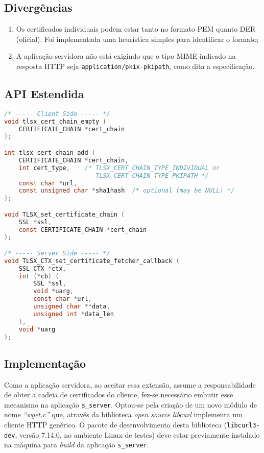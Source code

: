 \subsection{Divergências}

\begin{enumerate}
\item Os certificados individuais podem estar tanto no formato \acs{PEM} quanto
\acs{DER} (oficial). Foi implementada uma heurística simples para identificar
o formato;

\item A aplicação servidora não está exigindo que o tipo \acs{MIME} indicado na
resposta HTTP seja \verb|application/pkix-pkipath|, como dita a
especificação.
\end{enumerate}

\subsection{API Estendida}

\begin{lstlisting}[language=C,%
		    emph={tlsx_cert_chain_empty,tlsx_cert_chain_add,%
		    TLSX_set_certificate_chain,TLSX_CTX_set_certificate_fetcher_callback},%
		    caption={API Estendida para a extensão \acs{CCU}}]
/* ----- Client Side ----- */
void tlsx_cert_chain_empty (
    CERTIFICATE_CHAIN *cert_chain
);

int tlsx_cert_chain_add (
    CERTIFICATE_CHAIN *cert_chain,
    int cert_type,    /* TLSX_CERT_CHAIN_TYPE_INDIVIDUAL or
                         TLSX_CERT_CHAIN_TYPE_PKIPATH */
    const char *url,
    const unsigned char *sha1hash  /* optional (may be NULL) */
);

void TLSX_set_certificate_chain (
    SSL *ssl,
    const CERTIFICATE_CHAIN *cert_chain
);

/* ----- Server Side ----- */
void TLSX_CTX_set_certificate_fetcher_callback (
    SSL_CTX *ctx,
    int (*cb) (
        SSL *ssl,
        void *uarg,
        const char *url,
        unsigned char **data,
        unsigned int *data_len
    ),
    void *uarg
);
\end{lstlisting}

\subsection{Implementação}

Como a aplicação servidora, ao aceitar essa extensão, assume a
responsabilidade de obter a cadeia de certificados do cliente, fez-se necessário
embutir esse mecanismo na aplicação \verb|s_server|. Optou-se pela criação de um
novo módulo de nome \textit{``wget.c''} que, através da biblioteca \emph{open source} \emph{libcurl}
\cite{Libcurl} implementa um cliente \acs{HTTP} genérico. O pacote de
desenvolvimento desta biblioteca (\verb|libcurl3-dev|, versão 7.14.0, no ambiente Linux de
testes) deve estar previamente instalado na máquina para \emph{build} da aplicação
\verb|s_server|.

